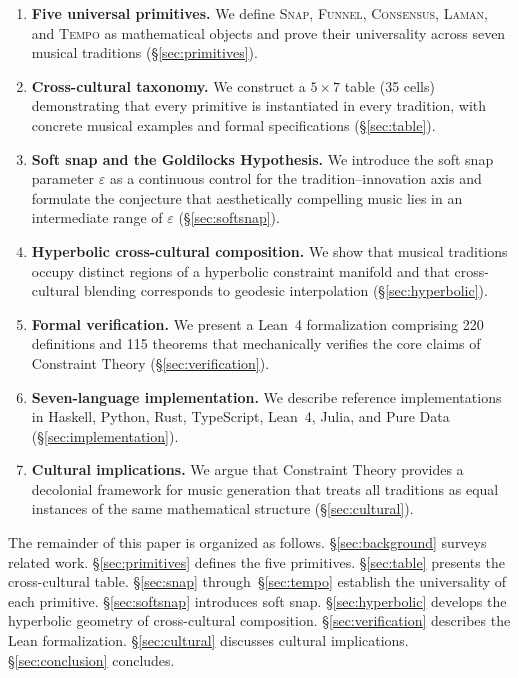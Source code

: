 \documentclass[cmj]{article}
\newcommand{\eps}{\varepsilon}
\newcommand{\SNAP}{\textsc{Snap}}
\newcommand{\FUNNEL}{\textsc{Funnel}}
\newcommand{\CONSENSUS}{\textsc{Consensus}}
\newcommand{\LAMAN}{\textsc{Laman}}
\newcommand{\TEMPO}{\textsc{Tempo}}
\begin{document}
\begin{enumerate}[leftmargin=*]
  \item \textbf{Five universal primitives.} We define \SNAP{}, \FUNNEL{},
    \CONSENSUS{}, \LAMAN{}, and \TEMPO{} as mathematical objects and prove
    their universality across seven musical traditions (\S\ref{sec:primitives}).

  \item \textbf{Cross-cultural taxonomy.} We construct a $5 \times 7$ table
    (35 cells) demonstrating that every primitive is instantiated in every
    tradition, with concrete musical examples and formal specifications
    (\S\ref{sec:table}).

  \item \textbf{Soft snap and the Goldilocks Hypothesis.} We introduce the
    soft snap parameter $\eps$ as a continuous control for the
    tradition--innovation axis and formulate the conjecture that aesthetically
    compelling music lies in an intermediate range of $\eps$
    (\S\ref{sec:softsnap}).

  \item \textbf{Hyperbolic cross-cultural composition.} We show that musical
    traditions occupy distinct regions of a hyperbolic constraint manifold and
    that cross-cultural blending corresponds to geodesic interpolation
    (\S\ref{sec:hyperbolic}).

  \item \textbf{Formal verification.} We present a Lean~4 formalization
    comprising 220 definitions and 115 theorems that mechanically verifies the
    core claims of Constraint Theory (\S\ref{sec:verification}).

  \item \textbf{Seven-language implementation.} We describe reference
    implementations in Haskell, Python, Rust, TypeScript, Lean~4, Julia, and
    Pure Data (\S\ref{sec:implementation}).

  \item \textbf{Cultural implications.} We argue that Constraint Theory
    provides a decolonial framework for music generation that treats all
    traditions as equal instances of the same mathematical structure
    (\S\ref{sec:cultural}).
\end{enumerate}

The remainder of this paper is organized as follows. \S\ref{sec:background}
surveys related work. \S\ref{sec:primitives} defines the five primitives.
\S\ref{sec:table} presents the cross-cultural table. \S\ref{sec:snap}
through~\S\ref{sec:tempo} establish the universality of each primitive.
\S\ref{sec:softsnap} introduces soft snap. \S\ref{sec:hyperbolic} develops
the hyperbolic geometry of cross-cultural composition. \S\ref{sec:verification}
describes the Lean formalization. \S\ref{sec:cultural} discusses cultural
implications. \S\ref{sec:conclusion} concludes.
\end{document}

